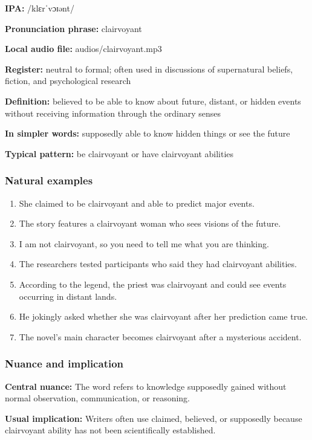 \documentclass[11pt]{article}
\begin{document}
\textbf{IPA:} /klɛrˈvɔɪənt/

\textbf{Pronunciation phrase:} clairvoyant

\textbf{Local audio file:} audios/clairvoyant.mp3

\textbf{Register:} neutral to formal; often used in discussions of supernatural beliefs, fiction, and psychological research

\textbf{Definition:} believed to be able to know about future, distant, or hidden events without receiving information through the ordinary senses

\textbf{In simpler words:} supposedly able to know hidden things or see the future

\textbf{Typical pattern:} be clairvoyant or have clairvoyant abilities

\subsubsection{Natural examples}
\begin{enumerate}
  \item She claimed to be clairvoyant and able to predict major events.
  \item The story features a clairvoyant woman who sees visions of the future.
  \item I am not clairvoyant, so you need to tell me what you are thinking.
  \item The researchers tested participants who said they had clairvoyant abilities.
  \item According to the legend, the priest was clairvoyant and could see events occurring in distant lands.
  \item He jokingly asked whether she was clairvoyant after her prediction came true.
  \item The novel's main character becomes clairvoyant after a mysterious accident.
\end{enumerate}

\subsubsection{Nuance and implication}
\textbf{Central nuance:} The word refers to knowledge supposedly gained without normal observation, communication, or reasoning.

\textbf{Usual implication:} Writers often use claimed, believed, or supposedly because clairvoyant ability has not been scientifically established.
\end{document}
